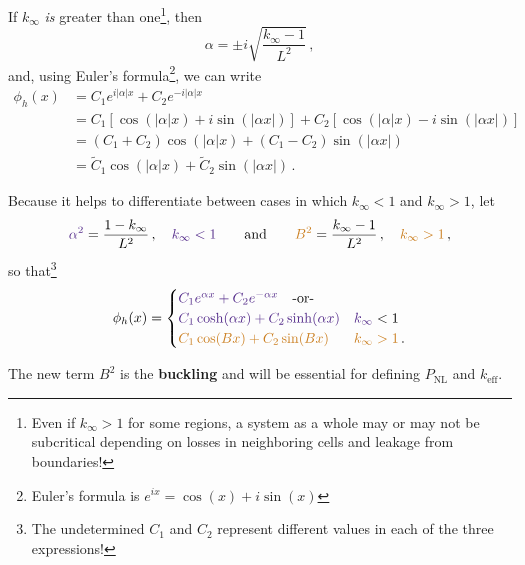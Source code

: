 \documentclass[compact]{ne630handout}
\begin{document}
\begin{handoutflow}
If $k_{\infty}$ {\it is} greater than one\footnote{Even if $k_{\infty} > 1$ for some regions, a system as a whole may or may not be subcritical depending on losses in neighboring cells and leakage from boundaries!}, then
\begin{equation*}
  \alpha = \pm i \sqrt{\frac{k_{\infty}-1}{L^2}} \, ,
\end{equation*}
and, using Euler's formula\footnote{Euler's formula is $e^{ix} = \cos(x) + i \sin(x)$}, we can write
\begin{align*}
 \phi_h(x) &=  C_1 e^{i | \alpha| x} + C_2 e^{-i|\alpha| x} \\
           &=  C_1[\cos(|\alpha|x)+i\sin(|\alpha x|)] + C_2[\cos(|\alpha|x)-i\sin(|\alpha x|)] \\
           &=  (C_1+C_2) \cos(|\alpha|x) +  (C_1-C_2) \sin(|\alpha x|) \\
           &=  \tilde{C}_{1} \cos(|\alpha|x) +  \tilde{C}_{2} \sin(|\alpha x|) \, .
\end{align*}

Because it helps to differentiate between cases in which $k_{\infty} < 1$
and $k_{\infty} > 1$, let
\begin{align*}
 \textcolor{wcprimary}{\alpha^2} =  \frac{1-k_{\infty}}{L^2} \, , \quad \textcolor{wcprimary}{k_{\infty} < 1}
 \qquad \text{and} \qquad
 \textcolor{wcalerted}{B^2}      =  \frac{k_{\infty}-1}{L^2} \, , \quad  \textcolor{wcalerted}{k_{\infty} > 1} \, ,
\end{align*}
so that\footnote{The undetermined $C_1$ and $C_2$ represent different values in each of the three expressions!}
\begin{align*}
 \phi_h(x) =
 \begin{cases}
  \textcolor{wcprimary}{C_1 e^{\alpha x} + C_2 e^{-\alpha x}} \quad \text{-or-} & \\
  \textcolor{wcprimary}{  C_1 \cosh(\alpha x) + C_2 \sinh(\alpha x)} & \textcolor{wcprimary}{k_{\infty}} < 1 \\
   \textcolor{wcalerted}{ C_1 \cos(B x) + C_2 \sin(B x)} & \textcolor{wcalerted}{ k_{\infty} > 1} \, .
 \end{cases}
\end{align*}

The new term $B^2$ is the {\bf buckling} and will be essential for
defining $P_{\text{NL}}$ and $k_{\text{eff}}$.


\end{handoutflow}
\end{document}
